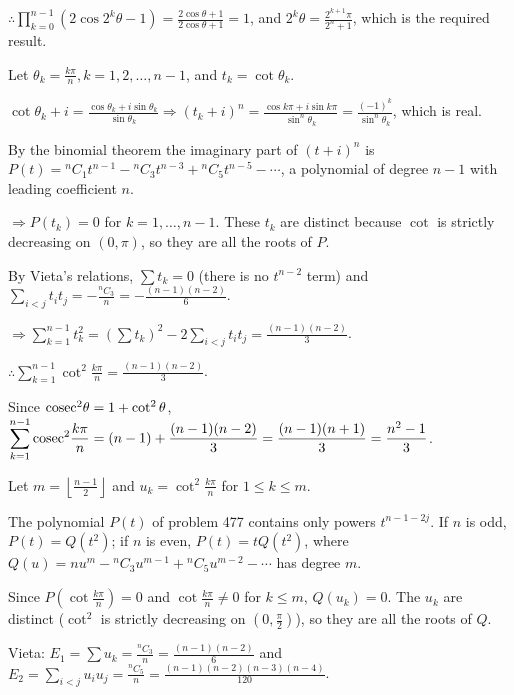   $\therefore\displaystyle\prod_{k = 0}^{n - 1}(2\cos2^k\theta - 1) = \frac{2\cos\theta + 1}{2\cos\theta + 1} =
  1$, and $2^k\theta = \frac{2^{k + 1}\pi}{2^n + 1}$, which is the required result.
\item Let $\theta_k = \frac{k\pi}{n}, k = 1, 2, \ldots, n - 1$, and $t_k = \cot\theta_k$.

  $\cot\theta_k + i = \frac{\cos\theta_k + i\sin\theta_k}{\sin\theta_k}\Rightarrow(t_k + i)^n
  = \frac{\cos k\pi + i\sin k\pi}{\sin^n\theta_k} = \frac{(-1)^k}{\sin^n\theta_k}$, which is real.

  By the binomial theorem the imaginary part of $(t + i)^n$ is $P(t) = {}^nC_1t^{n - 1} - {}^nC_3t^{n - 3} +
  {}^nC_5t^{n - 5} - \cdots$, a polynomial of degree $n - 1$ with leading coefficient $n$.

  $\Rightarrow P(t_k) = 0$ for $k = 1, \ldots, n - 1$. These $t_k$ are distinct because $\cot$ is strictly
  decreasing on $(0, \pi)$, so they are all the roots of $P$.

  By Vieta's relations, $\displaystyle\sum t_k = 0$ (there is no $t^{n - 2}$ term) and
  $\displaystyle\sum_{i < j}t_it_j = -\frac{{}^nC_3}{n} = -\frac{(n - 1)(n - 2)}{6}$.

  $\Rightarrow\displaystyle\sum_{k = 1}^{n - 1}t_k^2 = \left(\sum t_k\right)^2 - 2\sum_{i < j}t_it_j
  = \frac{(n - 1)(n - 2)}{3}$.

  $\therefore\displaystyle\sum_{k = 1}^{n - 1}\cot^2\frac{k\pi}{n} = \frac{(n - 1)(n - 2)}{3}$.

  Since ${\rm cosec}^2\theta = 1 + \cot^2\theta$, $\displaystyle\sum_{k = 1}^{n - 1}{\rm
    cosec}^2\frac{k\pi}{n} = (n - 1) + \frac{(n - 1)(n - 2)}{3} = \frac{(n - 1)(n + 1)}{3} = \frac{n^2 -
    1}{3}$.
\item Let $m = \left\lfloor\frac{n - 1}{2}\right\rfloor$ and $u_k = \cot^2\frac{k\pi}{n}$ for $1\leq k\leq
  m$.

  The polynomial $P(t)$ of problem 477 contains only powers $t^{n - 1 - 2j}$. If $n$ is odd, $P(t) = Q(t^2)$;
  if $n$ is even, $P(t) = tQ(t^2)$, where $Q(u) = nu^m - {}^nC_3u^{m - 1} + {}^nC_5u^{m - 2} - \cdots$ has
  degree $m$.

  Since $P\left(\cot\frac{k\pi}{n}\right) = 0$ and $\cot\frac{k\pi}{n}\neq 0$ for $k\leq m$, $Q(u_k) = 0$. The
  $u_k$ are distinct ($\cot^2$ is strictly decreasing on $\left(0, \frac{\pi}{2}\right)$), so they are all
  the roots of $Q$.

  Vieta: $E_1 = \displaystyle\sum u_k = \frac{{}^nC_3}{n} = \frac{(n - 1)(n - 2)}{6}$ and $E_2
  = \displaystyle\sum_{i < j}u_iu_j = \frac{{}^nC_5}{n} = \frac{(n - 1)(n - 2)(n - 3)(n - 4)}{120}$.

